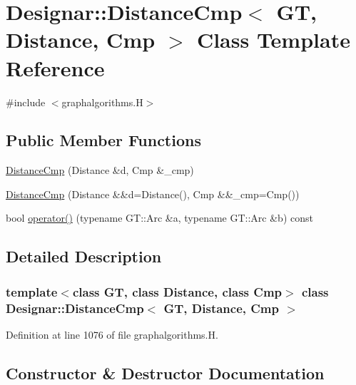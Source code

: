 \hypertarget{class_designar_1_1_distance_cmp}{}\section{Designar\+:\+:Distance\+Cmp$<$ GT, Distance, Cmp $>$ Class Template Reference}
\label{class_designar_1_1_distance_cmp}


{\ttfamily \#include $<$graphalgorithms.\+H$>$}

\subsection*{Public Member Functions}
\begin{DoxyCompactItemize}
\item 
\hyperlink{class_designar_1_1_distance_cmp_a13ea231791225247024720da213506a3}{Distance\+Cmp} (Distance \&d, Cmp \&\+\_\+cmp)
\item 
\hyperlink{class_designar_1_1_distance_cmp_a1b9bedd922fc3007038b63fe19bfd10e}{Distance\+Cmp} (Distance \&\&d=Distance(), Cmp \&\&\+\_\+cmp=Cmp())
\item 
bool \hyperlink{class_designar_1_1_distance_cmp_a5de92b27c64e3493d950a99018d28671}{operator()} (typename G\+T\+::\+Arc \&a, typename G\+T\+::\+Arc \&b) const
\end{DoxyCompactItemize}


\subsection{Detailed Description}
\subsubsection*{template$<$class GT, class Distance, class Cmp$>$\newline
class Designar\+::\+Distance\+Cmp$<$ G\+T, Distance, Cmp $>$}



Definition at line 1076 of file graphalgorithms.\+H.



\subsection{Constructor \& Destructor Documentation}
\mbox{\label{class_designar_1_1_distance_cmp_a13ea231791225247024720da213506a3}} 
